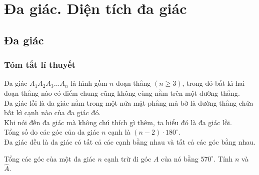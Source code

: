 \chapter{Đa giác. Diện tích đa giác}
\section{Đa giác}
\subsection{Tóm tắt lí thuyết}
Đa giác $A_1A_2A_3\ldots A_n$ là hình gồm $n$ đoạn thẳng $(n\ge 3)$, trong đó bất kì hai đoạn thẳng nào có điểm chung cũng không cùng nằm trên một đường thẳng.\\
Đa giác lồi là đa giác nằm trong một nửa mặt phẳng mà bờ là đường thẳng chứa bất kì cạnh nào của đa giác đó.\\
Khi nói đến đa giác mà không chú thích gì thêm, ta hiểu đó là đa giác lồi.\\
Tổng số đo các góc của đa giác $n$ cạnh là $(n-2)\cdot 180^\circ$.\\
Đa giác đều là đa giác có tất cả các cạnh bằng nhau và tất cả các góc bằng nhau.
\begin{vd}
Tổng các góc của một đa giác $n$ cạnh trừ đi góc $A$ của nó bằng $570^\circ$. Tính $n$ và~$\widehat{A}$.
\end{vd}
